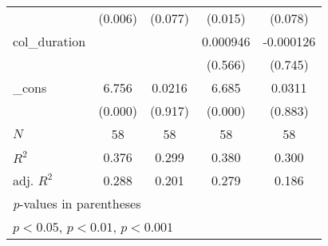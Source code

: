 {\begin{tabular}{l*{4}{c}}
            &     (0.006)         &     (0.077)         &     (0.015)         &     (0.078)         \\
[1em]
col\_duration&                     &                     &    0.000946         &   -0.000126         \\
            &                     &                     &     (0.566)         &     (0.745)         \\
[1em]
\_cons      &       6.756\sym{***}&      0.0216         &       6.685\sym{***}&      0.0311         \\
            &     (0.000)         &     (0.917)         &     (0.000)         &     (0.883)         \\
\hline
\(N\)       &          58         &          58         &          58         &          58         \\
\(R^{2}\)   &       0.376         &       0.299         &       0.380         &       0.300         \\
adj. \(R^{2}\)&       0.288         &       0.201         &       0.279         &       0.186         \\
\hline\hline
\multicolumn{5}{l}{\footnotesize \textit{p}-values in parentheses}\\
\multicolumn{5}{l}{\footnotesize \sym{*} \(p<0.05\), \sym{**} \(p<0.01\), \sym{***} \(p<0.001\)}\\
\end{tabular}
}
